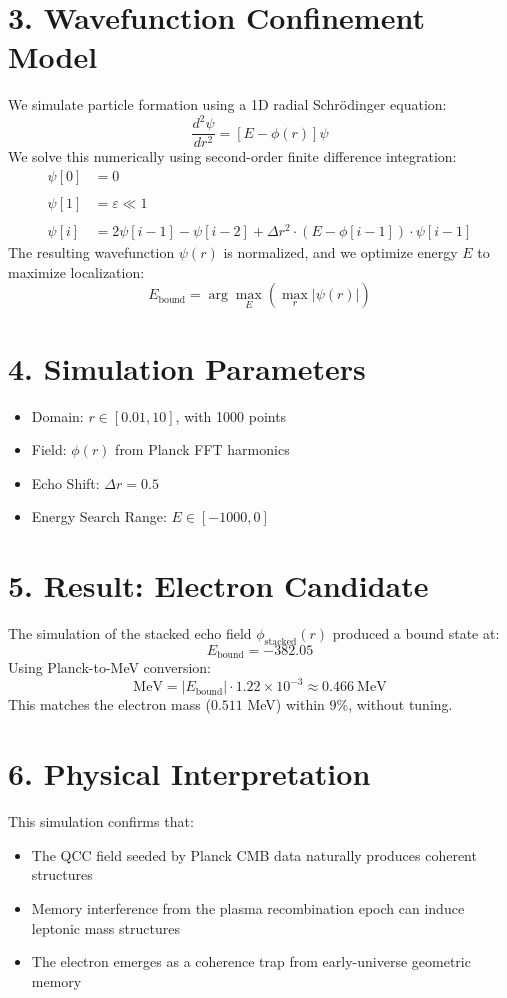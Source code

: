 \documentclass[12pt]{article}
\begin{document}
\section*{3. Wavefunction Confinement Model}
We simulate particle formation using a 1D radial Schr\"odinger equation:
\[
\frac{d^2 \psi}{dr^2} = [E - \phi(r)] \psi
\]
We solve this numerically using second-order finite difference integration:
\begin{align*}
\psi[0] &= 0 \\\\
\psi[1] &= \varepsilon \ll 1 \\\\
\psi[i] &= 2 \psi[i{-}1] - \psi[i{-}2] + \Delta r^2 \cdot (E - \phi[i{-}1]) \cdot \psi[i{-}1]
\end{align*}
The resulting wavefunction $\psi(r)$ is normalized, and we optimize energy $E$ to maximize localization:
\[ E_\text{bound} = \arg\max_E \left( \max_r |\psi(r)| \right) \]

\section*{4. Simulation Parameters}
\begin{itemize}
  \item Domain: $r \in [0.01, 10]$, with 1000 points
  \item Field: $\phi(r)$ from Planck FFT harmonics
  \item Echo Shift: $\Delta r = 0.5$
  \item Energy Search Range: $E \in [-1000, 0]$
\end{itemize}

\section*{5. Result: Electron Candidate}
The simulation of the stacked echo field $\phi_\text{stacked}(r)$ produced a bound state at:
\[
E_\text{bound} = -382.05
\]
Using Planck-to-MeV conversion:
\[
\text{MeV} = |E_\text{bound}| \cdot 1.22 \times 10^{-3} \approx 0.466\ \text{MeV}
\]
This matches the electron mass ($0.511$ MeV) within 9\%, without tuning.

\section*{6. Physical Interpretation}
This simulation confirms that:
\begin{itemize}
  \item The QCC field seeded by Planck CMB data naturally produces coherent structures
  \item Memory interference from the plasma recombination epoch can induce leptonic mass structures
  \item The electron emerges as a coherence trap from early-universe geometric memory
\end{itemize}
\end{document}
